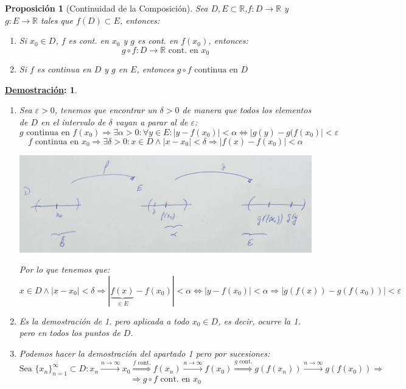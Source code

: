 \documentclass[10pt,a4paper,openright]{book}
\theoremstyle{break}
\newtheorem*{prop}{Proposición}
\newtheorem*{demo}{\underline{Demostración}:}
\begin{document}
\begin{prop}[Continuidad de la Composición]
Sea $D, E\subset \mathbb R$,$f: D\longrightarrow \mathbb R$ y $g: E\longrightarrow \mathbb R$ tales que $f(D)\subset E$, entonces:
\begin{enumerate}
\item Si $x_0\in D$, $f$ es cont. en $x_0$ y $g$ es cont. en $f(x_0)$, entonces:
$$g\circ f: D\longrightarrow \mathbb R\mbox{ cont. en }x_0$$

\item Si $f$ es continua en $D$ y $g$ en $E$, entonces $g\circ f\mbox{ continua en } D$
\end{enumerate}
\end{prop}
\begin{demo}
\begin{enumerate}
\item Sea $\varepsilon>0$, tenemos que encontrar un $\delta>0$ de manera que todos los elementos de $D$ en el intervalo de $\delta $ vayan a parar al de $\varepsilon$:
$$g\mbox{ continua en }f(x_0)\Rightarrow \exists \alpha>0: \forall y\in E: |y-f(x_0)|<\alpha\Leftrightarrow |g(y)-g(f(x_0)|<\varepsilon$$
$$f\mbox{ continua en }x_0\Rightarrow \exists \delta>0: x\in D \wedge |x-x_0|<\delta\Rightarrow |f(x)-f(x_0)|<\alpha$$

\begin{center}
\includegraphics[scale=0.35]{continuidad de composicion}
\end{center}

Por lo que tenemos que:
$$x\in D \wedge |x-x_0|<\delta\Rightarrow |\underbrace{f(x)}_{\in E}-f(x_0)|<\alpha\Leftrightarrow |y-f(x_0)|<\alpha\Rightarrow |g(f(x))-g(f(x_0))|<\varepsilon$$

\item Es la demostración de 1. pero aplicada a todo $x_0\in D$, es decir, ocurre la 1. pero en todos los puntos de $D$. 

\item Podemos hacer la demostración del apartado 1 pero por sucesiones:
$$\mbox{Sea }\{x_n\}_{n=1}^\infty\subset D: x_n\xrightarrow{n\rightarrow\infty} x_0\stackrel{f \mbox{ cont.}}{\Rightarrow} f(x_n)\xrightarrow{n\rightarrow\infty} f(x_0)\stackrel{g \mbox{ cont.}}{\Rightarrow}g(f(x_n))\xrightarrow{n\rightarrow \infty} g(f(x_0))\Rightarrow$$
$$\Rightarrow g\circ f\mbox{ cont. en } x_0$$
\end{enumerate}
\end{demo}
\end{document}

